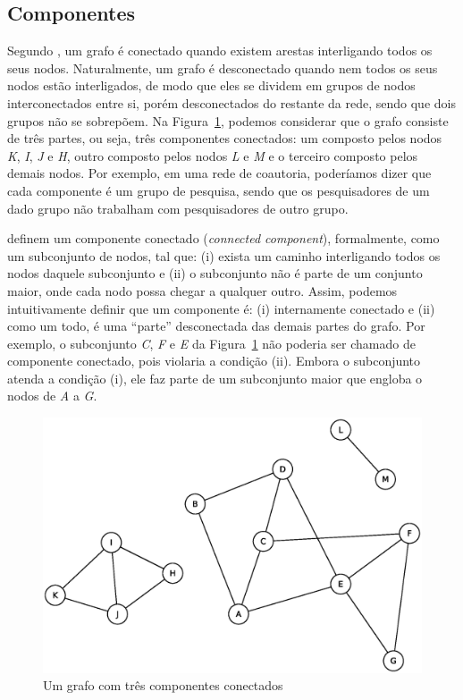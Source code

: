 \subsection{Componentes}

Segundo \cite{Easley2010}, um grafo é conectado quando existem arestas interligando todos os seus nodos. Naturalmente, 
um grafo é desconectado quando nem todos os seus nodos estão interligados, de modo que eles se dividem em grupos de nodos 
interconectados entre si, porém desconectados do restante da rede, sendo que dois grupos não se sobrepõem. Na 
Figura~\ref{fig:componentes_conectados}, podemos considerar que o grafo consiste de três partes, ou seja, três componentes
conectados: um composto pelos nodos \textit{K}, \textit{I}, \textit{J} e \textit{H}, outro composto pelos nodos 
\textit{L} e \textit{M} e o terceiro composto pelos demais nodos. Por exemplo, em uma rede de coautoria, poderíamos dizer
que cada componente é um grupo de pesquisa, sendo que os pesquisadores de um dado grupo não trabalham com pesquisadores
de outro grupo.

\cite{Easley2010} definem um componente conectado (\textit{connected component}), formalmente, como um subconjunto de 
nodos, tal que: (i) exista um caminho interligando todos os nodos daquele subconjunto e (ii) o subconjunto não é parte 
de um conjunto maior, onde cada nodo possa chegar a qualquer outro. Assim, podemos intuitivamente
definir que um componente é: (i) internamente conectado e (ii) como um todo, é uma ``parte'' 
desconectada das demais partes do grafo. Por exemplo, o subconjunto \textit{C}, \textit{F} e \textit{E} da 
Figura~\ref{fig:componentes_conectados} não poderia ser chamado de componente conectado, pois violaria a 
condição (ii). Embora o subconjunto atenda a condição (i), ele faz parte de um subconjunto maior que engloba 
o nodos de \textit{A} a \textit{G}.

\begin{figure}[!htb]
\centering
\includegraphics[scale=0.55]{../imgs/componentes.eps}
\caption{Um grafo com três componentes conectados}
\label{fig:componentes_conectados}
\end{figure}


